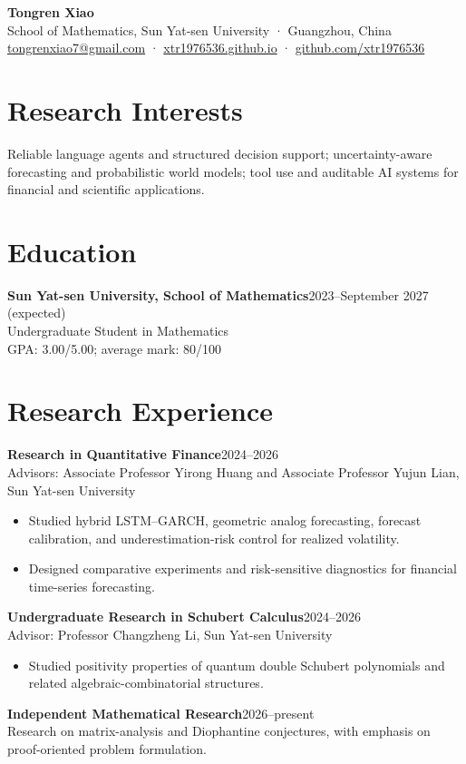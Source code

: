 \documentclass[10pt]{article}
\newcommand{\entry}[2]{\textbf{#1}\hfill #2\\}
\begin{document}
\begin{center}\LARGE\textbf{Tongren Xiao}\\[-2pt]\normalsize
School of Mathematics, Sun Yat-sen University · Guangzhou, China\\
\href{mailto:tongrenxiao7@gmail.com}{tongrenxiao7@gmail.com} · \href{https://xtr1976536.github.io/}{xtr1976536.github.io} · \href{https://github.com/xtr1976536}{github.com/xtr1976536}
\end{center}
\section*{Research Interests}
Reliable language agents and structured decision support; uncertainty-aware forecasting and probabilistic world models; tool use and auditable AI systems for financial and scientific applications.
\section*{Education}
\entry{Sun Yat-sen University, School of Mathematics}{2023--September 2027 (expected)}
Undergraduate Student in Mathematics\\
GPA: 3.00/5.00; average mark: 80/100
\section*{Research Experience}
\entry{Research in Quantitative Finance}{2024--2026}
Advisors: Associate Professor Yirong Huang and Associate Professor Yujun Lian, Sun Yat-sen University
\begin{itemize}
\item Studied hybrid LSTM--GARCH, geometric analog forecasting, forecast calibration, and underestimation-risk control for realized volatility.
\item Designed comparative experiments and risk-sensitive diagnostics for financial time-series forecasting.
\end{itemize}
\entry{Undergraduate Research in Schubert Calculus}{2024--2026}
Advisor: Professor Changzheng Li, Sun Yat-sen University
\begin{itemize}\item Studied positivity properties of quantum double Schubert polynomials and related algebraic-combinatorial structures.\end{itemize}
\entry{Independent Mathematical Research}{2026--present}
Research on matrix-analysis and Diophantine conjectures, with emphasis on proof-oriented problem formulation.
\end{document}

